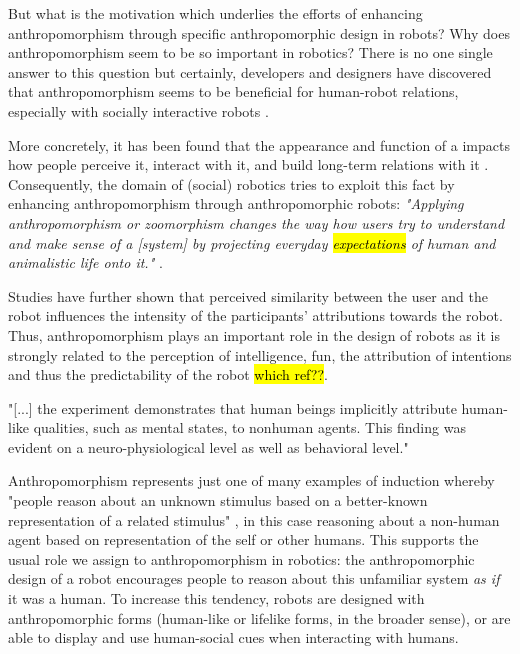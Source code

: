 \documentclass{frontiersSCNS} %
\begin{document}




But what is the motivation which underlies the efforts of enhancing anthropomorphism through specific anthropomorphic design in robots? Why does anthropomorphism seem to be so important in robotics? There is no one single answer to this question but certainly, developers and designers have discovered that anthropomorphism seems to be beneficial for human-robot relations, especially with socially interactive robots \cite{fong_survey_2003}.

More concretely, it has been found that the appearance and function of a impacts how people perceive it, interact with it, and build long-term relations with it \cite{bartneck_shaping_2004}. Consequently, the domain of (social) robotics tries to exploit this fact by enhancing anthropomorphism through anthropomorphic robots: \textit{"Applying anthropomorphism or zoomorphism changes the way how users try to understand and make sense of a [system] by projecting everyday \hl{expectations} of human and animalistic life onto it."} \cite{schmitz_concepts_2011}. 

Studies have further shown that perceived similarity between the user and the robot influences the intensity of the participants' attributions towards the robot. Thus, anthropomorphism plays an important role in the design of robots as it is strongly related to the perception of intelligence, fun, the attribution of intentions and thus the predictability of the robot \hl{which ref??}.


"[...] the experiment demonstrates that human beings implicitly attribute human-like qualities, such as mental states, to nonhuman agents. This finding was evident on a neuro-physiological level as well as behavioral level." \cite{hegel_understanding_2008}


Anthropomorphism represents just one of many examples of induction whereby "people reason about an unknown stimulus based on a better-known representation of a related stimulus" \cite{epley_when_2008}, in this case reasoning about a non-human agent based on representation of the self or other humans. This supports the usual role we assign to anthropomorphism in robotics: the anthropomorphic design of a robot encourages people to reason about this unfamiliar system \emph{as if} it was a human. To increase this tendency, robots are designed with anthropomorphic forms (human-like or lifelike forms, in the broader sense), or are able to display and use human-social cues when interacting with humans.\\
\end{document}
